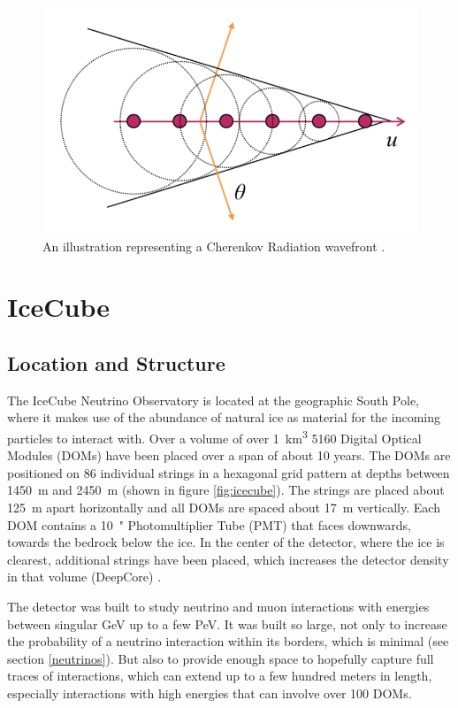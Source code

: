 \documentclass[a4paper,10pt]{scrartcl}
\begin{document}
\begin{figure}[h]
    \includegraphics[scale=0.7]{images/cherenkov-light.png}
    \centering
    \caption{An illustration representing a Cherenkov Radiation wavefront \cite{left}.}
    \label{fig:cherenkovlight}
\end{figure}


\section{IceCube}

\subsection{Location and Structure}

The IceCube Neutrino Observatory is located at the geographic South Pole, where it makes use of the abundance of natural ice as material for the incoming particles to interact with.
Over a volume of over \SI{1}{km^3} 5160 Digital Optical Modules (DOMs) have been placed over a span of about 10 years.
The DOMs are positioned on 86 individual strings in a hexagonal grid pattern at depths between \SI{1450}{m} and \SI{2450}{m} (shown in figure \ref{fig:icecube}).
The strings are placed about \SI{125}{m} apart horizontally and all DOMs are spaced about \SI{17}{m} vertically.
Each DOM contains a \SI{10}{"} Photomultiplier Tube (PMT) that faces downwards, towards the bedrock below the ice.
In the center of the detector, where the ice is clearest, additional strings have been placed, which increases the detector density in that volume (DeepCore) \cite{icecube}.

The detector was built to study neutrino and muon interactions with energies between singular GeV up to a few PeV.
It was built so large, not only to increase the probability of a neutrino interaction within its borders, which is minimal (see section \ref{neutrinos}).
But also to provide enough space to hopefully capture full traces of interactions, which can extend up to a few hundred meters in length, especially interactions with high energies that can involve over 100 DOMs.
\end{document}

